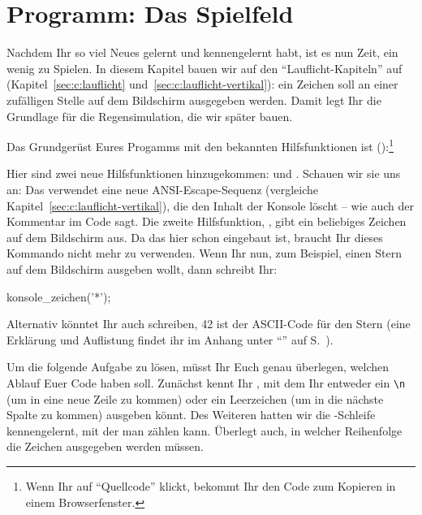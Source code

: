\section{Programm: Das Spielfeld}
\label{sec:c:spielfeld}

Nachdem Ihr so viel Neues gelernt und kennengelernt habt, ist es nun Zeit, ein wenig zu Spielen. In diesem Kapitel bauen wir auf den ``Lauflicht-Kapiteln'' auf (Kapitel~\ref{sec:c:lauflicht} und~\ref{sec:c:lauflicht-vertikal}): ein Zeichen soll an einer zufälligen Stelle auf dem Bildschirm ausgegeben werden. Damit legt Ihr die Grundlage für die Regensimulation, die wir später bauen.

Das Grundgerüst Eures Progamms mit den bekannten Hilfsfunktionen ist ():\footnote{%
    Wenn Ihr auf ``Quellcode'' klickt, bekommt Ihr den Code zum Kopieren in einem Browserfenster.
}

\noindent
Hier sind zwei neue Hilfsfunktionen hinzugekommen:  und . Schauen wir sie uns an: Das  verwendet eine neue ANSI-Escape-Sequenz (vergleiche Kapitel~\ref{sec:c:lauflicht-vertikal}), die den Inhalt der Konsole löscht -- wie auch der Kommentar im Code sagt. Die zweite Hilfsfunktion, , gibt ein beliebiges Zeichen auf dem Bildschirm aus. Da das  hier schon eingebaut ist, braucht Ihr dieses Kommando nicht mehr zu verwenden. Wenn Ihr nun, zum Beispiel, einen Stern auf dem Bildschirm ausgeben wollt, dann schreibt Ihr:
\begin{code}[numbers=none]
    konsole_zeichen('*');
\end{code}
Alternativ könntet Ihr auch  schreiben, 42 ist der ASCII-Code für den Stern (eine Erklärung und Auflistung findet ihr im Anhang unter ``'' auf S.~\pageref{sec:referenz:ascii}).

Um die folgende Aufgabe zu lösen, müsst Ihr Euch genau überlegen, welchen Ablauf Euer Code haben soll. Zunächst kennt Ihr , mit dem Ihr entweder ein \texttt{\textbackslash n} (um in eine neue Zeile zu kommen) oder ein Leerzeichen (um in die nächste Spalte zu kommen) ausgeben könnt. Des Weiteren hatten wir die -Schleife kennengelernt, mit der man zählen kann. Überlegt auch, in welcher Reihenfolge die Zeichen ausgegeben werden müssen.


